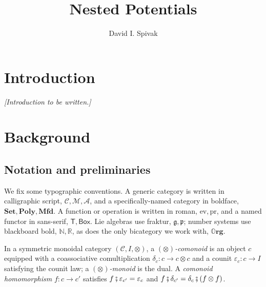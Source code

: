 \documentclass[11pt, oneside, article]{memoir}
\theoremstyle{definition}
\theoremstyle{plain}
\newcommand{\cat}[1]{\mathcal{#1}}%
\newcommand{\Cat}[1]{\mathbf{#1}}%
\newcommand{\fun}[1]{\mathrm{#1}}%
\newcommand{\Fun}[1]{\mathsf{#1}}%
\newcommand{\then}{\mathbin{\fatsemi}}
\newcommand{\nn}{\mathbb{N}}
\newcommand{\rr}{\mathbb{R}}
\newcommand{\org}{{\mathbb{O}\Cat{rg}}}
\newcommand{\lie}[1]{\mathfrak{#1}}
\begin{document}
\title{Nested Potentials}

\author{David I. Spivak}

\date{\vspace{-.2in}}

\maketitle

\begin{abstract}

\end{abstract}

\tableofcontents

\chapter{Introduction}\label{ch.intro}

\emph{[Introduction to be written.]}


\chapter{Background}\label{ch.background}

\section{Notation and preliminaries}\label{sec.prelim}

We fix some typographic conventions. A generic category is written in calligraphic script, $\cat{C},\cat{M},\cat{A}$, and a specifically-named category in boldface, $\Cat{Set},\Cat{Poly},\Cat{Mfd}$. A function or operation is written in roman, $\fun{ev},\fun{pr}$, and a named functor in sans-serif, $\Fun{T},\Fun{Box}$. Lie algebras use fraktur, $\lie{g},\lie{p}$; number systems use blackboard bold, $\nn,\rr$, as does the only bicategory we work with, $\org$. 

In a symmetric monoidal category $(\cat{C},I,\otimes)$, a \emph{$(\otimes)$-comonoid} is an object $c$ equipped with a coassociative comultiplication $\delta_c\colon c\to c\otimes c$ and a counit $\varepsilon_c\colon c\to I$ satisfying the counit law; a \emph{$(\otimes)$-monoid} is the dual. A \emph{comonoid homomorphism} $f\colon c\to c'$ satisfies $f\then\varepsilon_{c'}=\varepsilon_c$ and $f\then\delta_{c'}=\delta_c\then(f\otimes f)$. 
\end{document}
